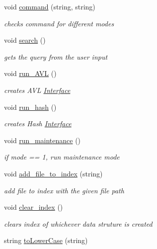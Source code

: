 \begin{DoxyCompactItemize}
void \hyperlink{class_interface_aa1d2750e9c624107fcde02b8d69eb69a}{command} (string, string)
\begin{DoxyCompactList}\small\item\em checks command for different modes \end{DoxyCompactList}\item 
void \hyperlink{class_interface_a043b8fe5fb3a2ca4603c7592d8c7d0e2}{search} ()
\begin{DoxyCompactList}\small\item\em gets the query from the user input \end{DoxyCompactList}\item 
void \hyperlink{class_interface_a57532e2ede5d40e3595427f4129517b9}{run\+\_\+\+A\+V\+L} ()
\begin{DoxyCompactList}\small\item\em creates A\+V\+L \hyperlink{class_interface}{Interface} \end{DoxyCompactList}\item 
void \hyperlink{class_interface_a53dd2dc9fcb214f40b4031f7854cffe3}{run\+\_\+hash} ()
\begin{DoxyCompactList}\small\item\em creates Hash \hyperlink{class_interface}{Interface} \end{DoxyCompactList}\item 
void \hyperlink{class_interface_a7384173d1857ae65156b58913ec31d1c}{run\+\_\+maintenance} ()
\begin{DoxyCompactList}\small\item\em if mode == 1, run maintenance mode \end{DoxyCompactList}\item 
void \hyperlink{class_interface_abf4ac54601aad5f8cb929a7649a8b935}{add\+\_\+file\+\_\+to\+\_\+index} (string)
\begin{DoxyCompactList}\small\item\em add file to index with the given file path \end{DoxyCompactList}\item 
void \hyperlink{class_interface_a19dbc4e711b5341ca2f81de689c6d5ee}{clear\+\_\+index} ()
\begin{DoxyCompactList}\small\item\em clears index of whichever data struture is created \end{DoxyCompactList}\item 
string \hyperlink{class_interface_ab1c8e554ab1de3e19c4bcd09682b701a}{to\+Lower\+Case} (string)

\end{DoxyCompactItemize}

